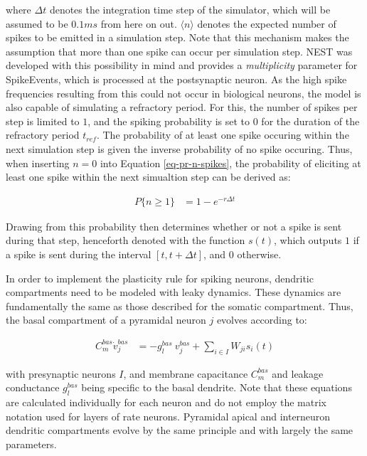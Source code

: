 where $\Delta t$ denotes the integration time step of the simulator, which will be assumed to be $0.1 ms$ from here on
out.  $\langle \textit{n} \rangle$ denotes the expected number of spikes to be emitted in a simulation step. Note that
this mechanism makes the assumption that more than one spike can occur per simulation step. NEST was developed with this
possibility in mind and provides a \textit{multiplicity} parameter for SpikeEvents, which is processed at the
postsynaptic neuron. As the high spike frequencies resulting from this could not occur in biological neurons, the model
is also capable of simulating a refractory period. For this, the number of spikes per step is limited to $1$, and the
spiking probability is set to 0 for the duration of the refractory period $t_{ref}$. The probability of at least one
spike occuring within the next simulation step is given the inverse probability of no spike occuring. Thus, when
inserting $n=0$ into Equation \ref{eq-pr-n-spikes}, the probability of eliciting at least one spike within the next
simualtion step can be derived as:

\begin{align}
  P\{ \textit{n} \geq 1\} & = 1 - e^{-r \Delta t}
\end{align}


Drawing from this probability then determines whether or not a spike is sent during that step, henceforth denoted with
the function $s(t)$, which outputs $1$ if a spike is sent during the interval $[t, t+\Delta t]$, and $0$ otherwise.
\newline

In order to implement the plasticity rule for spiking neurons, dendritic compartments need to be modeled with leaky
dynamics. These dynamics are fundamentally the same as those described for the somatic compartment. Thus, the basal
compartment of a pyramidal neuron $j$ evolves according to:

\begin{align}
  C_m^{bas} \dot{v}_j^{bas} & = -g_l^{bas} \  v_j^{bas} + \sum_{i \in I} W_{ji} s_i(t)     \label{eq-spiking-basal-compartment}
\end{align}

with presynaptic neurons $I$, and membrane capacitance $C_m^{bas}$ and leakage conductance $g_l^{bas}$ being specific to
the basal dendrite. Note that these equations are calculated individually for each neuron and do not employ the matrix
notation used for layers of rate neurons. Pyramidal apical and interneuron dendritic compartments evolve by the same
principle and with largely the same parameters.

